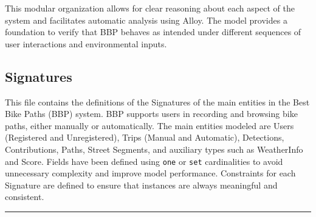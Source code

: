 This modular organization allows for clear reasoning about each aspect of the system and facilitates automatic analysis using Alloy. The model provides a foundation to verify that BBP behaves as intended under different sequences of user interactions and environmental inputs.

\subsection{Signatures}

This file contains the definitions of the Signatures of the main entities in the Best Bike Paths (BBP) system. 
BBP supports users in recording and browsing bike paths, either manually or automatically. The main entities 
modeled are Users (Registered and Unregistered), Trips (Manual and Automatic), Detections, Contributions, 
Paths, Street Segments, and auxiliary types such as WeatherInfo and Score. Fields have been defined using 
\texttt{one} or \texttt{set} cardinalities to avoid unnecessary complexity and improve model performance. 
Constraints for each Signature are defined to ensure that instances are always meaningful and consistent. 

\noindent\rule{\linewidth}{0.4pt} %

